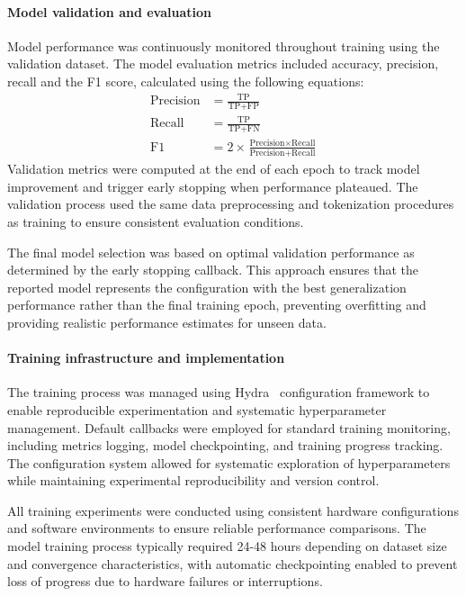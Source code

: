 \documentclass[pdflatex,sn-nature]{sn-jnl}%
\theoremstyle{thmstyleone}%
\theoremstyle{thmstyletwo}%
\theoremstyle{thmstylethree}%
\begin{document}
\paragraph{Model validation and evaluation}
Model performance was continuously monitored throughout training using the validation dataset.
The model evaluation metrics included accuracy, precision, recall and the F1 score, calculated using the following equations:
\begin{align*}
	\textrm{Precision} & = \frac{\textrm{TP}}{\textrm{TP}+\textrm{FP}}                                                     \\
	\textrm{Recall}    & = \frac{\textrm{TP}}{\textrm{TP}+\textrm{FN}}                                                     \\
	\textrm{F1}        & = 2 \times \frac{\textrm{Precision} \times \textrm{Recall}}{\textrm{Precision} + \textrm{Recall}}
\end{align*}
Validation metrics were computed at the end of each epoch to track model improvement and trigger early stopping when performance plateaued.
The validation process used the same data preprocessing and tokenization procedures as training to ensure consistent evaluation conditions.

The final model selection was based on optimal validation performance as determined by the early stopping callback.
This approach ensures that the reported model represents the configuration with the best generalization performance rather than the final training epoch, preventing overfitting and providing realistic performance estimates for unseen data.

\paragraph{Training infrastructure and implementation}
The training process was managed using Hydra~\cite{Yadan2019Hydra} configuration framework to enable reproducible experimentation and systematic hyperparameter management.
Default callbacks were employed for standard training monitoring, including metrics logging, model checkpointing, and training progress tracking.
The configuration system allowed for systematic exploration of hyperparameters while maintaining experimental reproducibility and version control.

All training experiments were conducted using consistent hardware configurations and software environments to ensure reliable performance comparisons.
The model training process typically required 24-48 hours depending on dataset size and convergence characteristics, with automatic checkpointing enabled to prevent loss of progress due to hardware failures or interruptions.
\end{document}
